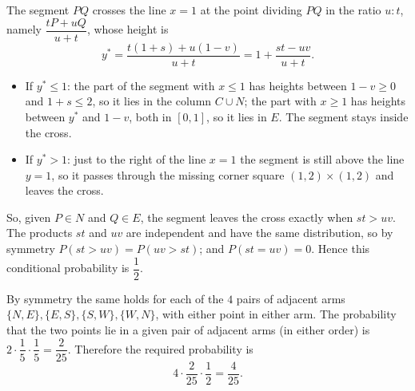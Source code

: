 The segment $PQ$ crosses the line $x=1$ at the point dividing $PQ$ in the ratio $u:t$, namely $\dfrac{tP+uQ}{u+t}$, whose height is
\[y^*=\dfrac{t(1+s)+u(1-v)}{u+t}=1+\dfrac{st-uv}{u+t}.\]
\begin{itemize}
\item If $y^*\le1$: the part of the segment with $x\le1$ has heights between $1-v\ge0$ and $1+s\le2$, so it lies in the column $C\cup N$; the part with $x\ge1$ has heights between $y^*$ and $1-v$, both in $[0,1]$, so it lies in $E$. The segment stays inside the cross.
\item If $y^*>1$: just to the right of the line $x=1$ the segment is still above the line $y=1$, so it passes through the missing corner square $(1,2)\times(1,2)$ and leaves the cross.
\end{itemize}
So, given $P\in N$ and $Q\in E$, the segment leaves the cross exactly when $st>uv$. The products $st$ and $uv$ are independent and have the same distribution, so by symmetry $P(st>uv)=P(uv>st)$; and $P(st=uv)=0$. Hence this conditional probability is $\dfrac12$.

By symmetry the same holds for each of the $4$ pairs of adjacent arms $\{N,E\},\{E,S\},\{S,W\},\{W,N\}$, with either point in either arm. The probability that the two points lie in a given pair of adjacent arms (in either order) is $2\cdot\dfrac15\cdot\dfrac15=\dfrac{2}{25}$. Therefore the required probability is
\[4\cdot\dfrac{2}{25}\cdot\dfrac12=\boxed{\dfrac{4}{25}}.\]
